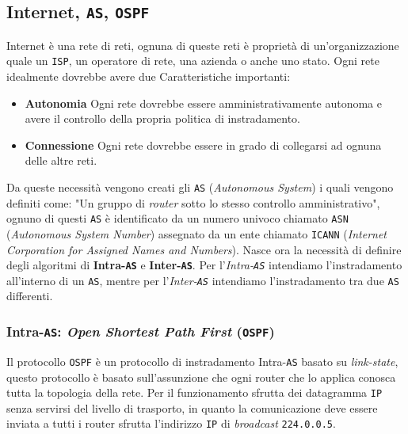     \subsection{Internet, \texttt{AS}, \texttt{OSPF}}
        Internet è una rete di reti, ognuna di queste reti è proprietà di un'organizzazione quale un \texttt{ISP}, un operatore di rete, una azienda o anche uno stato. Ogni rete idealmente dovrebbe avere due Caratteristiche importanti: \begin{itemize}
            \item \textbf{Autonomia} Ogni rete dovrebbe essere amministrativamente autonoma e avere il controllo della propria politica di instradamento.
            \item \textbf{Connessione} Ogni rete dovrebbe essere in grado di collegarsi ad ognuna delle altre reti.
        \end{itemize}
        Da queste necessità vengono creati gli \texttt{AS} (\textit{Autonomous System}) i quali vengono definiti come: "Un gruppo di \textit{router} sotto lo stesso controllo amministrativo", ognuno di questi \texttt{AS} è identificato da un numero univoco chiamato \texttt{ASN} (\textit{Autonomous System Number}) assegnato da un ente chiamato \texttt{ICANN} (\textit{Internet Corporation for Assigned Names and Numbers}). \newline
        Nasce ora la necessità di definire degli algoritmi di \textbf{Intra-\texttt{AS}} e \textbf{Inter-\texttt{AS}}. Per l'\textit{Intra-\texttt{AS}} intendiamo l'instradamento all'interno di un \texttt{AS}, mentre per l'\textit{Inter-\texttt{AS}} intendiamo l'instradamento tra due \texttt{AS} differenti.
        \subsubsection{Intra-\texttt{AS}: \textit{Open Shortest Path First} (\texttt{OSPF})}
            Il protocollo \texttt{OSPF} è un protocollo di instradamento Intra-\texttt{AS} basato su \textit{link-state}, questo protocollo è basato sull'assunzione che ogni router che lo applica conosca tutta la topologia della rete. Per il funzionamento sfrutta dei datagramma \texttt{IP} senza servirsi del livello di trasporto, in quanto la comunicazione deve essere inviata a tutti i router sfrutta l'indirizzo \texttt{IP} di \textit{broadcast} \texttt{224.0.0.5}.
